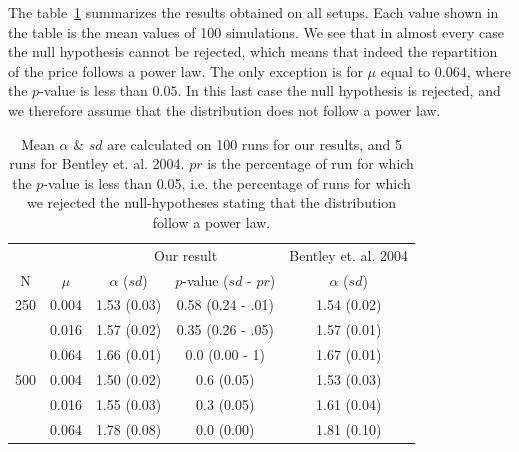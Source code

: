 \documentclass{wscpaperproc}
\newcommand{\memo}[2]{\textcolor{#1}{#2}}
\renewcommand{\memo}[2]{} %
\newcommand{\todo}[1]{\memo{red}{TODO: #1\\}}
\begin{document}

The table~\ref{tab:mualpha} summarizes the results obtained on all setups. Each value shown in the table is the mean values of 100 simulations. We see that in almost every case the null hypothesis cannot be rejected, which means that indeed the repartition of the price follows a power law. The only exception is for $\mu$ equal to $0.064$, where the $p$-value is less than $0.05$. In this last case the null hypothesis is rejected, and we therefore assume that the distribution does not follow a power law.

\todo{complete table with final result (here it's just false exemple)}
\begin{table}[!h]
	\centering
	\begin{tabular}{cc|ccc}
		\multicolumn{2}{r}{}&\multicolumn{2}{c}{Our result}&\multicolumn{1}{c}{Bentley et. al. 2004}\\
			N&$\mu$ & $\alpha$ ($sd$) & $p$-value ($sd$ - $pr$) &$\alpha$ ($sd$)\\\hline
		250	&0.004&1.53 (0.03)&0.58 (0.24 - .01)&1.54 (0.02)\\
			&0.016&1.57 (0.02)&0.35 (0.26 - .05)&1.57 (0.01)\\
			&0.064&1.66 (0.01)&0.0 (0.00 - 1)&1.67 (0.01)\\\hline
		500	&0.004&1.50 (0.02)&0.6 (0.05)&1.53 (0.03)\\
			&0.016&1.55 (0.03)&0.3 (0.05)&1.61 (0.04)\\
			&0.064&1.78 (0.08)&0.0 (0.00)&1.81 (0.10)\\
	\end{tabular}
	\caption{Mean $\alpha$ \& $sd$ are calculated on 100 runs for our results, and 5 runs for Bentley et. al. 2004. $pr$ is the percentage of run for which the $p$-value is less than 0.05, i.e. the percentage of runs for which we rejected the null-hypotheses stating that the distribution follow a power law.}
	\label{tab:mualpha}
\end{table}
\end{document}
